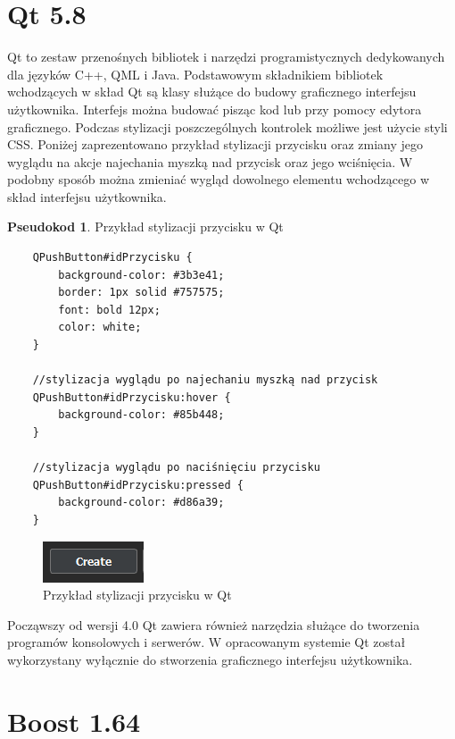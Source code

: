 \documentclass[a4paper,11pt,twoside]{report}
\theoremstyle{definition}
\newtheorem{pseudokod}{Pseudokod}[subsection]
\begin{document}
\section{Qt 5.8}

Qt to zestaw przenośnych bibliotek i narzędzi programistycznych dedykowanych dla języków C++, QML i Java. Podstawowym składnikiem bibliotek wchodzących w skład Qt są klasy służące do budowy graficznego interfejsu użytkownika. Interfejs można budować pisząc kod lub przy pomocy edytora graficznego. Podczas stylizacji poszczególnych kontrolek możliwe jest użycie styli CSS. Poniżej zaprezentowano przykład stylizacji przycisku oraz zmiany jego wyglądu na akcje najechania myszką nad przycisk oraz jego wciśnięcia. W podobny sposób można zmieniać wygląd dowolnego elementu wchodzącego w skład interfejsu użytkownika.

\begin{pseudokod}
Przykład stylizacji przycisku w Qt
\begin{verbatim}
    QPushButton#idPrzycisku {
        background-color: #3b3e41;
        border: 1px solid #757575;
        font: bold 12px;
        color: white;
    }
    
    //stylizacja wyglądu po najechaniu myszką nad przycisk
    QPushButton#idPrzycisku:hover {
        background-color: #85b448;
    }
    
    //stylizacja wyglądu po naciśnięciu przycisku
    QPushButton#idPrzycisku:pressed {
        background-color: #d86a39;
    }
\end{verbatim}
\end{pseudokod}

\begin{figure}[h!]
\centering
\includegraphics[scale=1.0]{QPushButton}
\caption[Przykład stylizacji przycisku w Qt]{Przykład stylizacji przycisku w Qt}
\end{figure}

Począwszy od wersji 4.0 Qt zawiera również narzędzia służące do tworzenia programów konsolowych i serwerów. W opracowanym systemie Qt został wykorzystany wyłącznie do stworzenia graficznego interfejsu użytkownika.

\section{Boost 1.64}
\end{document}
